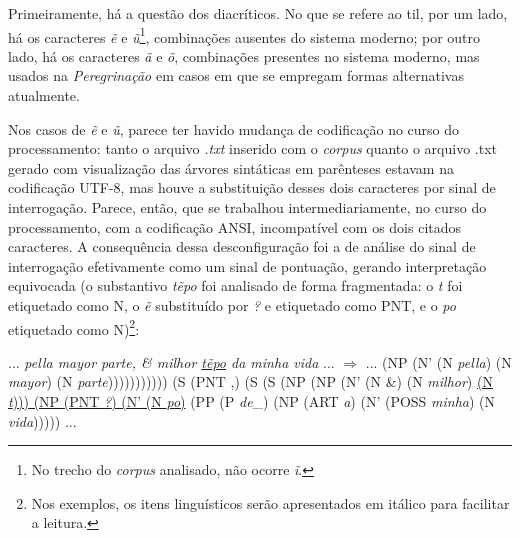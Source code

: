 \documentclass[portuguese]{textolivre}
\begin{document}
Primeiramente, há a questão dos diacríticos. No que se refere ao til, por um lado, há os caracteres \textit{ẽ} e \textit{ũ}\footnote{No trecho do \textit{corpus} analisado, não ocorre \textit{ĩ}.}, combinações ausentes do sistema moderno; por outro lado, há os caracteres \textit{ã} e \textit{õ}, combinações presentes no sistema moderno, mas usados na \textit{Peregrinação} em casos em que se empregam formas alternativas atualmente.

Nos casos de \textit{ẽ} e \textit{ũ}, parece ter havido mudança de codificação no curso do processamento: tanto o arquivo \textit{.txt} inserido com o \textit{corpus} quanto o arquivo .txt gerado com visualização das árvores sintáticas em parênteses estavam na codificação UTF-8, mas houve a substituição desses dois caracteres por sinal de interrogação. Parece, então, que se trabalhou intermediariamente, no curso do processamento, com a codificação ANSI, incompatível com os dois citados caracteres. A consequência dessa desconfiguração foi a de análise do sinal de interrogação efetivamente como um sinal de pontuação, gerando interpretação equivocada (o substantivo \textit{tẽpo} foi analisado de forma fragmentada: o \textit{t} foi etiquetado como N, o \textit{ẽ} substituído por \textit{?} e etiquetado como PNT, e o \textit{po} etiquetado como N)\footnote{Nos exemplos, os itens linguísticos serão apresentados em itálico para facilitar a leitura.}:

\begin{description}[topsep=10pt, parsep=2pt, itemindent=!]
\item[(03)\label{03}] 
... \textit{pella mayor parte, \& milhor \uline{tẽpo} da minha vida} ... $\Rightarrow$ ... (NP (N' (N \textit{pella}) (N \textit{mayor}) (N \textit{parte}))))))))))) (S (PNT ,) (S (S (NP (NP (N' (N \&) (N \textit{milhor}) \uline{(N \textit{t}))) (NP (PNT \textit{?}) (N' (N \textit{po})} (PP (P \textit{de}\_) (NP (ART \textit{a}) (N' (POSS \textit{minha}) (N \textit{vida}))))) ...
\end{description}
\end{document}
